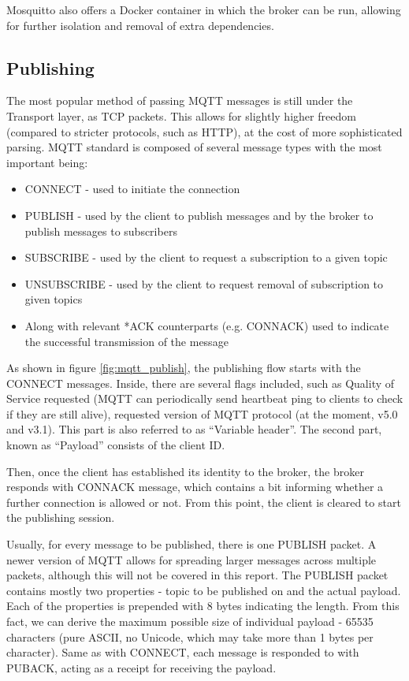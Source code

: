 Mosquitto also offers a Docker container \cite{light2017mosquitto} in which the broker can be run, allowing for further isolation and removal of extra dependencies.

\subsection{Publishing}

The most popular method of passing MQTT messages is still under the Transport layer, as TCP packets. This allows for slightly higher freedom (compared to stricter protocols, such as HTTP), at the cost of more sophisticated parsing. MQTT standard is composed of several message types with the most important being:
\begin{itemize}
  \item CONNECT - used to initiate the connection
  \item PUBLISH - used by the client to publish messages and by the broker to publish messages to subscribers
  \item SUBSCRIBE - used by the client to request a subscription to a given topic
  \item UNSUBSCRIBE - used by the client to request removal of subscription to given topics
  \item Along with relevant *ACK counterparts (e.g. CONNACK) used to indicate the successful transmission of the message
\end{itemize}
As shown in figure \ref{fig:mqtt_publish}, the publishing flow starts with the CONNECT messages. Inside, there are several flags included, such as Quality of Service requested (MQTT can periodically send heartbeat ping to clients to check if they are still alive), requested version of MQTT protocol (at the moment, v5.0 and v3.1). This part is also referred to as ``Variable header''. The second part, known as ``Payload'' consists of the client ID.

Then, once the client has established its identity to the broker, the broker responds with CONNACK message, which contains a bit informing whether a further connection is allowed or not. From this point, the client is cleared to start the publishing session.

Usually, for every message to be published, there is one PUBLISH packet. A newer version of MQTT allows for spreading larger messages across multiple packets, although this will not be covered in this report. The PUBLISH packet contains mostly two properties - topic to be published on and the actual payload. Each of the properties is prepended with 8 bytes indicating the length. From this fact, we can derive the maximum possible size of individual payload - 65535 characters (pure ASCII, no Unicode, which may take more than 1 bytes per character). Same as with CONNECT, each message is responded to with PUBACK, acting as a receipt for receiving the payload.

